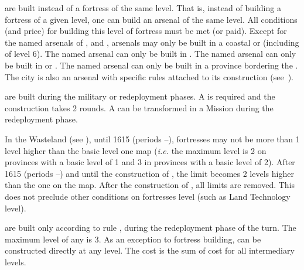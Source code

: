 \aparag[Arsenals]\label{chExpenses:Build Arsenals} are built instead of
a fortress of the same level. That is, instead of building a fortress of a
given level, one can build an arsenal of the same level. All conditions (and
price) for building this level of fortress must be met (or paid).
\bparag Except for the named arsenals of ,
 and , arsenals may
only be built in a coastal \TP or \COL (including \COL of level 6).
\bparag The named arsenal  can only be built in
.
\bparag The named arsenal  can only be built in
 or .
\bparag The named arsenal  can only be built in a
province bordering the \regionNoire.
\bparag The city  is also an arsenal
 with specific rules attached to its
construction (see~).

\aparag[Forts] are built during the military or redeployment phases.
\bparag A \LD is required and the construction takes 2 rounds.
\bparag A \LeaderMis can be transformed in a Mission during the redeployment
phase.

\aparag[Wasteland]\label{chExpenses:Fortresses Wasteland} In the Wasteland (see
), until 1615 (periods --),
fortresses may not be more than 1 level higher than the basic level one map
(\emph{i.e.} the maximum level is 2 on provinces with a basic level of 1 and 3
in provinces with a basic level of 2).
\bparag After 1615 (periods --) and until the
construction of , the limit becomes 2 levels higher
than the one on the map.
\bparag After the construction of , all limits are
removed.
\bparag This does not preclude other conditions on fortresses level (such as
Land Technology level).

\aparag[\Presidios] are built only according to rule
, during the redeployment phase of the
turn. The maximum level of any \Presidio is 3.
\bparag As an exception to fortress building, \Presidio can be constructed
directly at any level. The cost is the sum of cost for all intermediary
levels.

